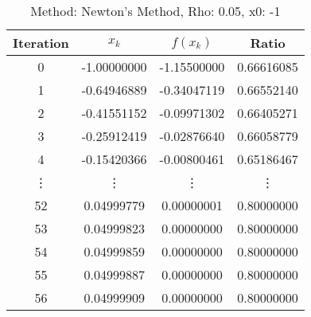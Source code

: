 \begin{table}
\centering
\caption{Method: Newton's Method, Rho: 0.05, x0: -1}
\label{tab:table_Newton's_Method_0_05_-1}
\begin{tabular}{c c c c}
\toprule
Iteration &       $x_k$ &    $f(x_k)$ &      Ratio \\
\midrule
        0 & -1.00000000 & -1.15500000 & 0.66616085 \\
        1 & -0.64946889 & -0.34047119 & 0.66552140 \\
        2 & -0.41551152 & -0.09971302 & 0.66405271 \\
        3 & -0.25912419 & -0.02876640 & 0.66058779 \\
        4 & -0.15420366 & -0.00800461 & 0.65186467 \\
   \vdots &      \vdots &      \vdots &     \vdots \\
       52 &  0.04999779 &  0.00000001 & 0.80000000 \\
       53 &  0.04999823 &  0.00000000 & 0.80000000 \\
       54 &  0.04999859 &  0.00000000 & 0.80000000 \\
       55 &  0.04999887 &  0.00000000 & 0.80000000 \\
       56 &  0.04999909 &  0.00000000 & 0.80000000 \\
\bottomrule
\end{tabular}
\end{table}
